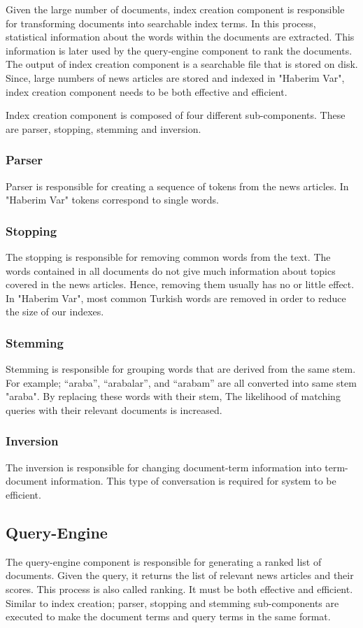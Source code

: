 \documentclass[conference]{IEEEtran}
\begin{document}
Given the large number of documents, index creation component is responsible for transforming documents into searchable index terms. In this process, statistical information about the words within the documents are extracted. This information is later used by the query-engine component to rank the documents. The output of index creation component is a searchable file that is stored on disk. Since, large numbers of news articles are stored and indexed in "Haberim Var", index creation component needs to be both effective and efficient.

Index creation component is composed of four different sub-components. These are parser, stopping, stemming and inversion.

\subsubsection{Parser}
Parser is responsible for creating a sequence of tokens from the news articles. In "Haberim Var" tokens correspond to single words.

\subsubsection{Stopping}
The stopping is responsible for removing common words from the text. The words contained in all documents do not give much information about topics covered in the news articles. Hence, removing them usually has no or little effect. In "Haberim Var", most common Turkish words are removed in order to reduce the size of our indexes.

\subsubsection{Stemming}
Stemming is responsible for grouping words that are derived from the same stem. For example; “araba”, “arabalar”, and “arabam” are all converted into same stem "araba". By replacing these words with their stem, The likelihood of matching queries with their relevant documents is increased.

\subsubsection{Inversion}
The inversion is responsible for changing document-term information into term-document information. This type of conversation is required for system to be efficient.

\subsection{Query-Engine}
The query-engine component is responsible for generating a ranked list of documents. Given the query, it returns the list of relevant news articles and their scores. This process is also called ranking. It must be both effective and efficient. Similar to index creation; parser, stopping and stemming sub-components are executed to make the document terms and query terms in the same format.
\end{document}
